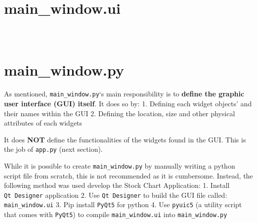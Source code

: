 \documentclass[11pt]{article}
\makeatletter
\newcommand{\boxspacing}{\kern\kvtcb@left@rule\kern\kvtcb@boxsep}
\newcommand{\prompt}[4]{
        \ttfamily\llap{{\color{#2}[#3]:\hspace{3pt}#4}}\vspace{-\baselineskip}
    }
\makeatother
\begin{document}
    \hypertarget{main_window.ui}{%
\section{main\_window.ui}\label{main_window.ui}}

    \begin{tcolorbox}[breakable, size=fbox, boxrule=1pt, pad at break*=1mm,colback=cellbackground, colframe=cellborder]
\prompt{In}{incolor}{ }{\boxspacing}
\begin{Verbatim}[commandchars=\\\{\}]

\end{Verbatim}
\end{tcolorbox}

    \begin{tcolorbox}[breakable, size=fbox, boxrule=1pt, pad at break*=1mm,colback=cellbackground, colframe=cellborder]
\prompt{In}{incolor}{ }{\boxspacing}
\begin{Verbatim}[commandchars=\\\{\}]

\end{Verbatim}
\end{tcolorbox}

    \begin{tcolorbox}[breakable, size=fbox, boxrule=1pt, pad at break*=1mm,colback=cellbackground, colframe=cellborder]
\prompt{In}{incolor}{ }{\boxspacing}
\begin{Verbatim}[commandchars=\\\{\}]

\end{Verbatim}
\end{tcolorbox}

    \hypertarget{main_window.py}{%
\section{main\_window.py}\label{main_window.py}}

    As mentioned, \texttt{main\_window.py}`s main responsibility is to
\textbf{define the graphic user interface (GUI) itself}. It does so by:
1. Defining each widget objects' and their names within the GUI 2.
Defining the location, size and other physical attributes of each
widgets

It does \textbf{NOT} define the functionalities of the widgets found in
the GUI. This is the job of \texttt{app.py} (next section).

While it is possible to create \texttt{main\_window.py} by manually
writing a python script file from scratch, this is not recommended as it
is cumbersome. Instead, the following method was used develop the Stock
Chart Application: 1. Install \texttt{Qt\ Designer} application 2. Use
\texttt{Qt\ Designer} to build the GUI file called:
\texttt{main\_window.ui} 3. Pip install \texttt{PyQt5} for python 4. Use
\texttt{pyuic5} (a utility script that comes with \texttt{PyQt5}) to
compile \texttt{main\_window.ui} into \texttt{main\_window.py}
\end{document}
